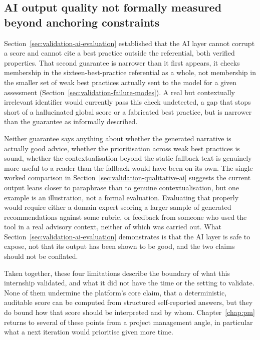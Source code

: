 \subsection{AI output quality not formally measured beyond anchoring constraints}
\label{sec:validation-ai-quality-limitation}

Section~\ref{sec:validation-ai-evaluation} established that the AI layer
cannot corrupt a score and cannot cite a best practice outside the
referential, both verified properties. That second guarantee is narrower
than it first appears, it checks membership in the sixteen-best-practice
referential as a whole, not membership in the smaller set of weak best
practices actually sent to the model for a given assessment
(Section~\ref{sec:validation-failure-modes}). A real but contextually irrelevant
identifier would currently pass this check undetected, a gap that stops
short of a hallucinated global score or a fabricated best practice, but is
narrower than the guarantee as informally described.

Neither guarantee says anything about whether the generated narrative is
actually good advice, whether the prioritisation across weak best practices
is sound, whether the contextualisation beyond the static fallback text is
genuinely more useful to a reader than the fallback would have been on its
own. The single worked comparison in Section~\ref{sec:validation-qualitative-ai}
suggests the current output leans closer to paraphrase than to genuine
contextualisation, but one example is an illustration, not a formal
evaluation. Evaluating that properly would require either a domain expert
scoring a larger sample of generated recommendations against some rubric, or
feedback from someone who used the tool in a real advisory context, neither
of which was carried out. What Section~\ref{sec:validation-ai-evaluation}
demonstrates is that the AI layer is safe to expose, not that its output has
been shown to be good, and the two claims should not be conflated.

Taken together, these four limitations describe the boundary of what this
internship validated, and what it did not have the time or the setting to
validate. None of them undermine the platform's core claim, that a
deterministic, auditable score can be computed from structured self-reported
answers, but they do bound how that score should be interpreted and by whom.
Chapter~\ref{chap:pm} returns to several of these points from a project
management angle, in particular what a next iteration would prioritise given
more time.